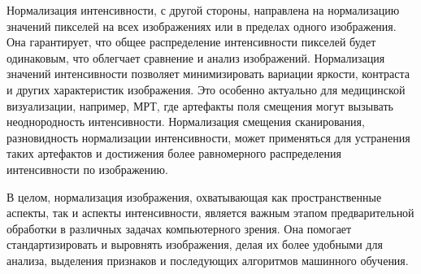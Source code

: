 Нормализация интенсивности, с другой стороны, направлена на нормализацию значений пикселей на всех изображениях или в пределах одного изображения. Она гарантирует, что общее распределение интенсивности пикселей будет одинаковым, что облегчает сравнение и анализ изображений. Нормализация значений интенсивности позволяет минимизировать вариации яркости, контраста и других характеристик изображения. Это особенно актуально для медицинской визуализации, например, МРТ, где артефакты поля смещения могут вызывать неоднородность интенсивности. Нормализация смещения сканирования, разновидность нормализации интенсивности, может применяться для устранения таких артефактов и достижения более равномерного распределения интенсивности по изображению.

В целом, нормализация изображения, охватывающая как пространственные аспекты, так и аспекты интенсивности, является важным этапом предварительной обработки в различных задачах компьютерного зрения. Она помогает стандартизировать и выровнять изображения, делая их более удобными для анализа, выделения признаков и последующих алгоритмов машинного обучения.

